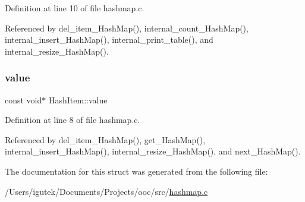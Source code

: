 Definition at line 10 of file hashmap.\+c.



Referenced by del\+\_\+item\+\_\+\+Hash\+Map(), internal\+\_\+count\+\_\+\+Hash\+Map(), internal\+\_\+insert\+\_\+\+Hash\+Map(), internal\+\_\+print\+\_\+table(), and internal\+\_\+resize\+\_\+\+Hash\+Map().

\mbox{\label{structHashItem_abb041948b3408787c4d46d9afd8fb793}} 
\subsubsection{\texorpdfstring{value}{value}}
{\footnotesize\ttfamily const void$\ast$ Hash\+Item\+::value}



Definition at line 8 of file hashmap.\+c.



Referenced by del\+\_\+item\+\_\+\+Hash\+Map(), get\+\_\+\+Hash\+Map(), internal\+\_\+insert\+\_\+\+Hash\+Map(), internal\+\_\+resize\+\_\+\+Hash\+Map(), and next\+\_\+\+Hash\+Map().



The documentation for this struct was generated from the following file\+:\begin{DoxyCompactItemize}
\item 
/\+Users/igutek/\+Documents/\+Projects/ooc/src/\mbox{\hyperlink{hashmap_8c}{hashmap.\+c}}\end{DoxyCompactItemize}
